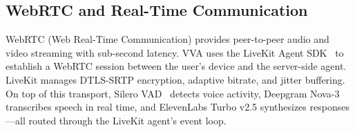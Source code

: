 \subsection{WebRTC and Real-Time Communication}

WebRTC (Web Real-Time Communication) provides peer-to-peer audio and video streaming with sub-second latency. VVA uses the LiveKit Agent SDK~\cite{livekit2023} to establish a WebRTC session between the user's device and the server-side agent. LiveKit manages DTLS-SRTP encryption, adaptive bitrate, and jitter buffering. On top of this transport, Silero VAD~\cite{silero2021vad} detects voice activity, Deepgram Nova-3 transcribes speech in real time, and ElevenLabs Turbo v2.5 synthesizes responses---all routed through the LiveKit agent's event loop.
